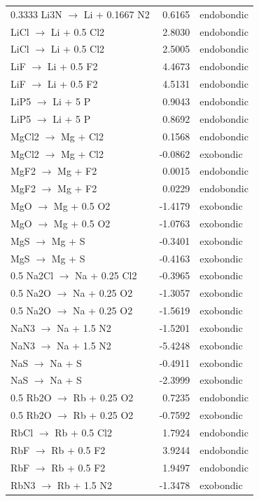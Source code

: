 \begin{longtable}{@{}lrl@{}}
0.3333 Li3N $\rightarrow$ Li + 0.1667 N2 & 0.6165 & endobondic \\
LiCl $\rightarrow$ Li + 0.5 Cl2 & 2.8030 & endobondic \\
LiCl $\rightarrow$ Li + 0.5 Cl2 & 2.5005 & endobondic \\
LiF $\rightarrow$ Li + 0.5 F2 & 4.4673 & endobondic \\
LiF $\rightarrow$ Li + 0.5 F2 & 4.5131 & endobondic \\
LiP5 $\rightarrow$ Li + 5 P & 0.9043 & endobondic \\
LiP5 $\rightarrow$ Li + 5 P & 0.8692 & endobondic \\
MgCl2 $\rightarrow$ Mg + Cl2 & 0.1568 & endobondic \\
MgCl2 $\rightarrow$ Mg + Cl2 & -0.0862 & exobondic \\
MgF2 $\rightarrow$ Mg + F2 & 0.0015 & endobondic \\
MgF2 $\rightarrow$ Mg + F2 & 0.0229 & endobondic \\
MgO $\rightarrow$ Mg + 0.5 O2 & -1.4179 & exobondic \\
MgO $\rightarrow$ Mg + 0.5 O2 & -1.0763 & exobondic \\
MgS $\rightarrow$ Mg + S & -0.3401 & exobondic \\
MgS $\rightarrow$ Mg + S & -0.4163 & exobondic \\
0.5 Na2Cl $\rightarrow$ Na + 0.25 Cl2 & -0.3965 & exobondic \\
0.5 Na2O $\rightarrow$ Na + 0.25 O2 & -1.3057 & exobondic \\
0.5 Na2O $\rightarrow$ Na + 0.25 O2 & -1.5619 & exobondic \\
NaN3 $\rightarrow$ Na + 1.5 N2 & -1.5201 & exobondic \\
NaN3 $\rightarrow$ Na + 1.5 N2 & -5.4248 & exobondic \\
NaS $\rightarrow$ Na + S & -0.4911 & exobondic \\
NaS $\rightarrow$ Na + S & -2.3999 & exobondic \\
0.5 Rb2O $\rightarrow$ Rb + 0.25 O2 & 0.7235 & endobondic \\
0.5 Rb2O $\rightarrow$ Rb + 0.25 O2 & -0.7592 & exobondic \\
RbCl $\rightarrow$ Rb + 0.5 Cl2 & 1.7924 & endobondic \\
RbF $\rightarrow$ Rb + 0.5 F2 & 3.9244 & endobondic \\
RbF $\rightarrow$ Rb + 0.5 F2 & 1.9497 & endobondic \\
RbN3 $\rightarrow$ Rb + 1.5 N2 & -1.3478 & exobondic \\

\end{longtable}
